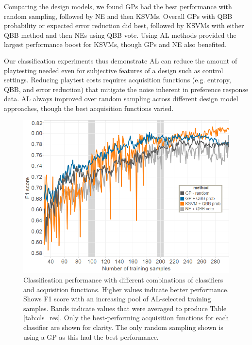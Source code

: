 \documentclass{sig-alternate}
\begin{document}
Comparing the design models, we found GPs had the best performance with random sampling, followed by NE and then KSVMs.
Overall GPs with QBB probability or expected error reduction did best, followed by KSVMs with either QBB method and then NEs using QBB vote.
Using AL methods provided the largest performance boost for KSVMs, though GPs and NE also benefited.


Our classification experiments thus demonstrate AL can reduce the amount of playtesting needed even for subjective features of a design such as control settings.
Reducing playtest costs requires acquisition functions (e.g. entropy, QBB, and error reduction) that mitigate the noise inherent in preference response data.
AL always improved over random sampling across different design model approaches, though the best acquisition functions varied.


\begin{figure}[tb]
\centering
\includegraphics[width=\linewidth]{classification_experiment_happy}
\caption{Classification performance with different combinations of classifiers and acquisition functions.
Higher values indicate better performance.
Shows F1 score with an increasing pool of AL-selected training samples.
Bands indicate values that were averaged to produce Table \ref{tab:cls_res}.
Only the best-performing acquisition functions for each classifier are shown for clarity.
The only random sampling shown is using a GP as this had the best performance.
}
\label{fig:cls_happy}
\end{figure}
\end{document}
